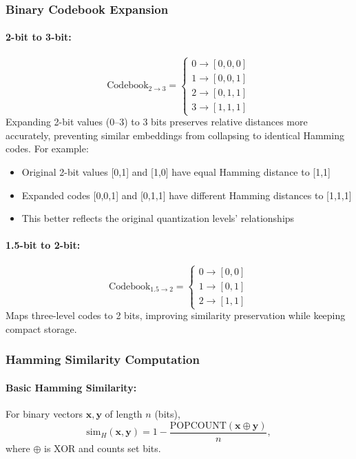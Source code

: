 \subsubsection{Binary Codebook Expansion}
\paragraph{2-bit to 3-bit:}
\begin{equation}
\text{Codebook}_{2\rightarrow3} =
\begin{cases}
0 \rightarrow [0,0,0]\\
1 \rightarrow [0,0,1]\\
2 \rightarrow [0,1,1]\\
3 \rightarrow [1,1,1]
\end{cases}
\end{equation}
Expanding 2-bit values (0--3) to 3 bits preserves relative distances more accurately, preventing similar embeddings from collapsing to identical Hamming codes.
For example:
\begin{itemize}
    \item Original 2-bit values [0,1] and [1,0] have equal Hamming distance to [1,1]
    \item Expanded codes [0,0,1] and [0,1,1] have different Hamming distances to [1,1,1]
    \item This better reflects the original quantization levels' relationships
\end{itemize}

\paragraph{1.5-bit to 2-bit:}
\begin{equation}
\text{Codebook}_{1.5\rightarrow2} =
\begin{cases}
0 \rightarrow [0,0]\\
1 \rightarrow [0,1]\\
2 \rightarrow [1,1]
\end{cases}
\end{equation}
Maps three-level codes to 2 bits, improving similarity preservation while keeping compact storage.

\subsubsection{Hamming Similarity Computation}
\paragraph{Basic Hamming Similarity:}
For binary vectors $\mathbf{x}, \mathbf{y}$ of length $n$ (bits),
\begin{equation}
    \text{sim}_H(\mathbf{x}, \mathbf{y}) 
    = 
    1 - \frac{\text{POPCOUNT}(\mathbf{x} \oplus \mathbf{y})}{n},
\end{equation}
where $\oplus$ is XOR and  counts set bits.

